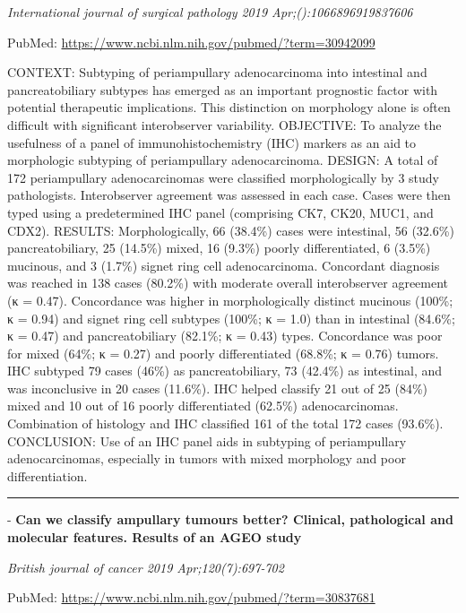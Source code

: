 \documentclass[]{article}
\begin{document}
\emph{International journal of surgical pathology 2019
Apr;():1066896919837606}

PubMed: \url{https://www.ncbi.nlm.nih.gov/pubmed/?term=30942099}

CONTEXT: Subtyping of periampullary adenocarcinoma into intestinal and
pancreatobiliary subtypes has emerged as an important prognostic factor
with potential therapeutic implications. This distinction on morphology
alone is often difficult with significant interobserver variability.
OBJECTIVE: To analyze the usefulness of a panel of immunohistochemistry
(IHC) markers as an aid to morphologic subtyping of periampullary
adenocarcinoma. DESIGN: A total of 172 periampullary adenocarcinomas
were classified morphologically by 3 study pathologists. Interobserver
agreement was assessed in each case. Cases were then typed using a
predetermined IHC panel (comprising CK7, CK20, MUC1, and CDX2). RESULTS:
Morphologically, 66 (38.4\%) cases were intestinal, 56 (32.6\%)
pancreatobiliary, 25 (14.5\%) mixed, 16 (9.3\%) poorly differentiated, 6
(3.5\%) mucinous, and 3 (1.7\%) signet ring cell adenocarcinoma.
Concordant diagnosis was reached in 138 cases (80.2\%) with moderate
overall interobserver agreement (κ = 0.47). Concordance was higher in
morphologically distinct mucinous (100\%; κ = 0.94) and signet ring cell
subtypes (100\%; κ = 1.0) than in intestinal (84.6\%; κ = 0.47) and
pancreatobiliary (82.1\%; κ = 0.43) types. Concordance was poor for
mixed (64\%; κ = 0.27) and poorly differentiated (68.8\%; κ = 0.76)
tumors. IHC subtyped 79 cases (46\%) as pancreatobiliary, 73 (42.4\%) as
intestinal, and was inconclusive in 20 cases (11.6\%). IHC helped
classify 21 out of 25 (84\%) mixed and 10 out of 16 poorly
differentiated (62.5\%) adenocarcinomas. Combination of histology and
IHC classified 161 of the total 172 cases (93.6\%). CONCLUSION: Use of
an IHC panel aids in subtyping of periampullary adenocarcinomas,
especially in tumors with mixed morphology and poor differentiation.

{}

{}

\begin{center}\rule{0.5\linewidth}{\linethickness}\end{center}

 - \textbf{Can we classify ampullary tumours better? Clinical,
pathological and molecular features. Results of an AGEO study}

\emph{British journal of cancer 2019 Apr;120(7):697-702}

PubMed: \url{https://www.ncbi.nlm.nih.gov/pubmed/?term=30837681}
\end{document}
